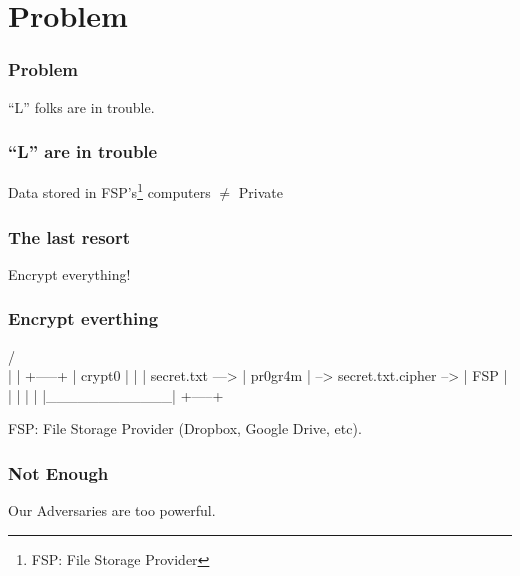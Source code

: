 
\section{Problem}

\begin{frame}
  \frametitle{Problem}
  \centering
  ``L'' folks are in trouble.
\end{frame}

\begin{frame}
  \frametitle{``L'' are in trouble}
  \centering
  Data stored in FSP's\footnote{FSP: File Storage Provider} computers $\ne$ Private
\end{frame}

\begin{frame}
  \frametitle{The last resort}
  \centering
  Encrypt everything!
\end{frame}

\begin{frame}[fragile]
  \frametitle{Encrypt everthing}
  {\tiny
  \begin{semiverbatim}
                        /^^^^^^^^^^^^\\
                        |            |                           +-----+
                        |  crypt0    |                           |     |
        secret.txt ---> |  pr0gr4m   | --> secret.txt.cipher --> | FSP |
                        |            |                           |     |
                        |____________|                           +-----+

     FSP: File Storage Provider (Dropbox, Google Drive, etc).
  \end{semiverbatim}
  }
\end{frame}


\begin{frame}
  \frametitle{Not Enough}
  \centering
  Our Adversaries are too powerful.
\end{frame}



